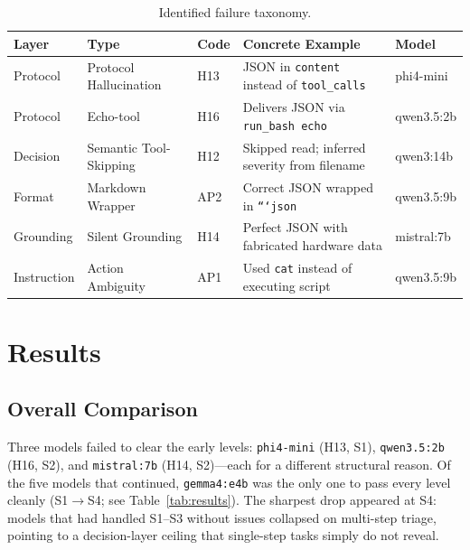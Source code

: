 \documentclass{kdmile}
\begin{document}
\begin{table}[H]
\centering
\caption{Identified failure taxonomy.}
\label{tab:failures}
\begin{tabular}{lllll}
\toprule
\textbf{Layer} & \textbf{Type} & \textbf{Code} & \textbf{Concrete Example} & \textbf{Model} \\
\midrule
Protocol  & Protocol Hallucination  & H13 & JSON in \texttt{content} instead of \texttt{tool\_calls} & phi4-mini \\
Protocol  & Echo-tool               & H16 & Delivers JSON via \texttt{run\_bash echo}                & qwen3.5:2b \\
Decision  & Semantic Tool-Skipping  & H12 & Skipped read; inferred severity from filename            & qwen3:14b \\
Format    & Markdown Wrapper        & AP2 & Correct JSON wrapped in \texttt{```json}                 & qwen3.5:9b \\
Grounding & Silent Grounding        & H14 & Perfect JSON with fabricated hardware data               & mistral:7b \\
Instruction& Action Ambiguity       & AP1 & Used \texttt{cat} instead of executing script            & qwen3.5:9b \\
\bottomrule
\end{tabular}
\end{table}

\section{Results}
\label{sec:results}

\subsection{Overall Comparison}

Three models failed to clear the early levels: \texttt{phi4-mini} (H13, S1),
\texttt{qwen3.5:2b} (H16, S2), and \texttt{mistral:7b} (H14, S2)—each for a
different structural reason.
Of the five models that continued, \texttt{gemma4:e4b} was the only one to pass
every level cleanly (S1$\rightarrow$S4; see Table~\ref{tab:results}).
The sharpest drop appeared at S4: models that had handled S1--S3 without issues
collapsed on multi-step triage, pointing to a decision-layer ceiling that
single-step tasks simply do not reveal.
\end{document}
